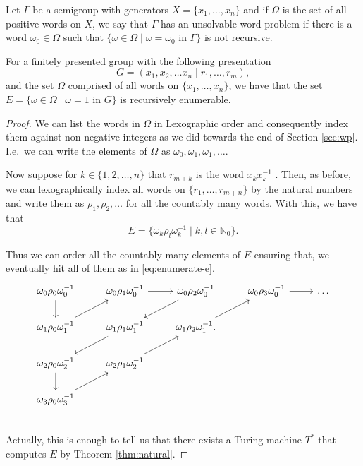 \begin{definition}
  Let $\Gamma$ be a semigroup with generators $X = \{x_1, \dots, x_n\}$ and if $\Omega$ is the set of all positive words on $X$, we say that $\Gamma$ has an unsolvable word problem if there is a word $\omega_0 \in \Omega$ such that $\{\omega \in \Omega \mid \omega = \omega_0 \text{ in } \Gamma\}$ is not recursive.
\end{definition}

\begin{theorem}
  \label{thm:semi-re}
  For a finitely presented group with the following presentation
  \begin{equation*}
    G = (x_1, x_2, \dots x_n \mid r_1, \dots, r_m), 
  \end{equation*}
  and the set $\Omega$ comprised of all words on $\{x_1, \dots, x_n \}$, we have that the set $E = \{\omega \in \Omega \mid \omega = 1 \text{ in } G\}$ is recursively enumerable.
\end{theorem}

\begin{proof}
  We can list the words in $\Omega$ in Lexographic order and consequently index them against non-negative integers as we did towards the end of Section \ref{sec:wp}. I.e.\ we can write the elements of $\Omega$ as $\omega_0, \omega_1, \omega_1, \dots$.
  
  Now suppose for $k \in \{1,2,\dots,n\}$ that $r_{m+k}$ is the word $x_k x_k^{-1}$ . Then, as before, we can lexographically index all words on $\{ r_1, \dots, r_{m+n}\}$ by the natural numbers and write them as $\rho_1,\rho_2, \dots$ for all the countably many words. With this, we have that
  \begin{equation*}
    E = \{\omega_k\rho_l\omega_k^{-1} \mid k,l \in \mathbb{N}_0\}.
  \end{equation*}

  Thus we can order all the countably many elements of $E$ ensuring that, we eventually hit all of them as in \ref{eq:enumerate-e}.
  \begin{equation}
    \label{eq:enumerate-e}
    \begin{tikzcd}
      \omega_0\rho_0\omega_0^{-1} \arrow[d] & \omega_0\rho_1\omega_0^{-1} \arrow[r] & \omega_0\rho_2\omega_0^{-1} \arrow[dl] & \omega_0\rho_3\omega_0^{-1}\arrow[r] & \dots \\
      \omega_1\rho_0\omega_1^{-1} \arrow[ur] & \omega_1\rho_1\omega_1^{-1} \arrow[dl]  & \omega_1\rho_2\omega_1^{-1} \arrow[ur]. \\
      \omega_2\rho_0\omega_2^{-1} \arrow[d]& \omega_2\rho_1\omega_2^{-1} \arrow[ur] \\
      \omega_3\rho_0\omega_3^{-1} \arrow[ur]\\
    \end{tikzcd}
  \end{equation}
  Actually, this is enough to tell us that there exists a Turing machine $T^*$ that computes $E$ by Theorem \ref{thm:natural}. 
\end{proof}

